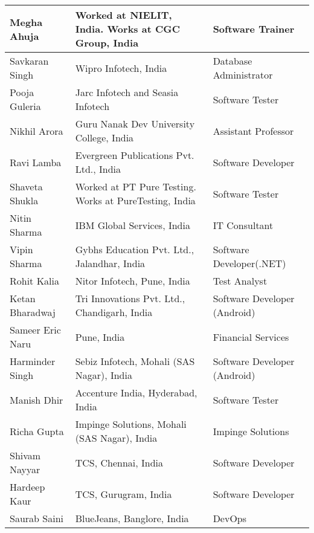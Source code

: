 \documentclass[margin,line]{res}
\begin{document}
\begin{resume}
\begin{center}
\begin{tabular}{ | p{3cm} | p{5cm} | l | }
    \hline
    Megha Ahuja & Worked at NIELIT, India. Works at CGC Group, India & Software Trainer\\
    \hline
    Savkaran Singh & Wipro Infotech, India & Database Administrator\\
    \hline
    Pooja Guleria & Jarc Infotech and Seasia Infotech & Software Tester\\
    \hline
    Nikhil Arora & Guru Nanak Dev University College, India & Assistant Professor\\
    \hline
    Ravi Lamba & Evergreen Publications Pvt. Ltd., India & Software Developer\\
    \hline
    Shaveta Shukla & Worked at PT Pure Testing. Works at PureTesting, India & Software Tester\\
    \hline 
    Nitin Sharma & IBM Global Services, India & IT Consultant\\
    \hline
    Vipin Sharma & Gybhs Education Pvt. Ltd., Jalandhar, India & Software Developer(.NET)\\
    \hline
    Rohit Kalia & Nitor Infotech, Pune, India & Test Analyst\\
    \hline
    Ketan Bharadwaj & Tri Innovations Pvt. Ltd., Chandigarh, India & Software Developer (Android)\\
    \hline
    Sameer Eric Naru & Pune, India & Financial Services\\
    \hline
    Harminder Singh & Sebiz Infotech, Mohali (SAS Nagar), India & Software Developer (Android)\\
    \hline
    Manish Dhir & Accenture India, Hyderabad, India & Software Tester\\
    \hline
    Richa Gupta & Impinge Solutions,  Mohali (SAS Nagar), India & Impinge Solutions\\
    \hline
    Shivam Nayyar & TCS, Chennai, India & Software Developer\\
    \hline
	Hardeep Kaur & TCS, Gurugram, India & Software Developer\\
	\hline
	Saurab Saini & BlueJeans, Banglore, India & DevOps\\
	\hline
    \end{tabular}
    
\end{center}

\end{resume}
\end{document}
